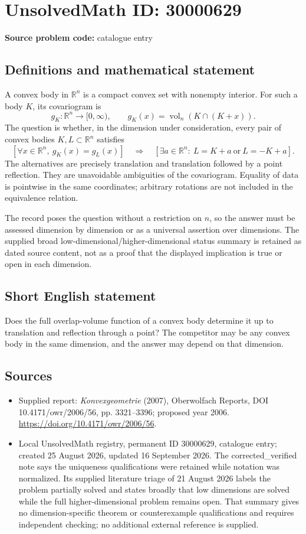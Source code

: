 \documentclass[11pt]{article}
\newcommand{\R}{\mathbb{R}}
\begin{document}
\section*{UnsolvedMath ID: 30000629}
\textbf{Source problem code:} catalogue entry
\subsection{Definitions and mathematical statement}
A convex body in $\R^n$ is a compact convex set with nonempty interior. For such a body $K$, its covariogram is
\[
g_K:\R^n\to[0,\infty),\qquad
g_K(x)=\operatorname{vol}_n(K\cap(K+x)).
\]
The question is whether, in the dimension under consideration, every pair of convex bodies $K,L\subset\R^n$ satisfies
\[
\left[\forall x\in\R^n,\ g_K(x)=g_L(x)\right]
\quad\Longrightarrow\quad
\left[\exists a\in\R^n:\ L=K+a\ \text{or}\ L=-K+a\right].
\]
The alternatives are precisely translation and translation followed by a point reflection. They are unavoidable ambiguities of the covariogram. Equality of data is pointwise in the same coordinates; arbitrary rotations are not included in the equivalence relation.

The record poses the question without a restriction on $n$, so the answer must be assessed dimension by dimension or as a universal assertion over dimensions. The supplied broad low-dimensional/higher-dimensional status summary is retained as dated source content, not as a proof that the displayed implication is true or open in each dimension.
\subsection{Short English statement}
Does the full overlap-volume function of a convex body determine it up to translation and reflection through a point? The competitor may be any convex body in the same dimension, and the answer may depend on that dimension.
\subsection{Sources}
\begin{itemize}
\item Supplied report: \emph{Konvexgeometrie} (2007), Oberwolfach Reports, DOI 10.4171/owr/2006/56, pp. 3321--3396; proposed year 2006. \url{https://doi.org/10.4171/owr/2006/56}.
\item Local UnsolvedMath registry, permanent ID 30000629, catalogue entry; created 25 August 2026, updated 16 September 2026. The corrected\_verified note says the uniqueness qualifications were retained while notation was normalized. Its supplied literature triage of 21 August 2026 labels the problem partially solved and states broadly that low dimensions are solved while the full higher-dimensional problem remains open. That summary gives no dimension-specific theorem or counterexample qualifications and requires independent checking; no additional external reference is supplied.
\end{itemize}
\end{document}
